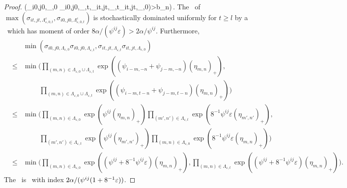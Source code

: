 \begin{proof}
\min(\sigma_{i0,j0,\Lambda_{\varepsilon,0}} \sigma_{i0,j0,\Lambda_{\varepsilon,t}},\sigma_{it,jt,\Lambda_{\varepsilon,t}}\sigma_{it,jt,\Lambda_{\varepsilon,0}})>b_n\big)\,.
\eeao
The \ds\ of $\max(\sigma_{it,jt,\Lambda_{\varepsilon,0,t}^c},\sigma_{i0,j0,\Lambda_{\varepsilon,0,t}^c})$ 
is stochastically dominated uniformly for $t\geq l$ by a \ds\ which has moment of order $8 \alpha/(\psi^{ij}\varepsilon)>2 \alpha/\psi^{ij}$. Furthermore,
\begin{eqnarray*}
 && \min(\sigma_{i0,j0,\Lambda_{\varepsilon,0}} \sigma_{i0,j0,\Lambda_{\varepsilon,t}},\sigma_{it,jt,\Lambda_{\varepsilon,t}}\sigma_{it,jt,\Lambda_{\varepsilon,0}})\\
 &\le & \min\Big(\prod_{(m,n) \in \Lambda_{\varepsilon,0} \cup \Lambda_{\varepsilon,t}}\exp((\psi_{i-m,-n}+\psi_{j-m,-n})(\eta_{m,n})_+),\\
 && \hspace{1cm}\prod_{(m,n) \in \Lambda_{\varepsilon,0} \cup \Lambda_{\varepsilon,t}}\exp((\psi_{i-m,t-n}+\psi_{j-m,t-n})(\eta_{m,n})_+)\Big)\,\\
 &\le& \min\Big(\prod_{(m,n) \in \Lambda_{\varepsilon,0}}\exp(\psi^{ij}(\eta_{m,n})_+)\prod_{(m',n') \in \Lambda_{\varepsilon,t}}\exp(8^{-1}\psi^{ij}\varepsilon (\eta_{m',n'})_+),\\
 && \hspace{1cm}\prod_{(m',n') \in \Lambda_{\varepsilon,t}}\exp(\psi^{ij}(\eta_{m',n'})_+)\prod_{(m,n) \in \Lambda_{\varepsilon,0}}\exp(8^{-1}\psi^{ij}\varepsilon (\eta_{m,n})_+)\Big)\, \\
 &\leq& \min\Big(\prod_{(m,n) \in \Lambda_{\varepsilon,0}}\exp((\psi^{ij}+8^{-1}\psi^{ij}\varepsilon)(\eta_{m,n})_+),
 \prod_{(m,n) \in \Lambda_{\varepsilon,t}}\exp((\psi^{ij}+8^{-1}\psi^{ij}\varepsilon)(\eta_{m,n})_+)\Big).
 \end{eqnarray*}
The \rhs\ is \regvary\ with index $2\alpha/(\psi^{ij}(1+8^{-1}{\varepsilon}))$.

\end{proof}
